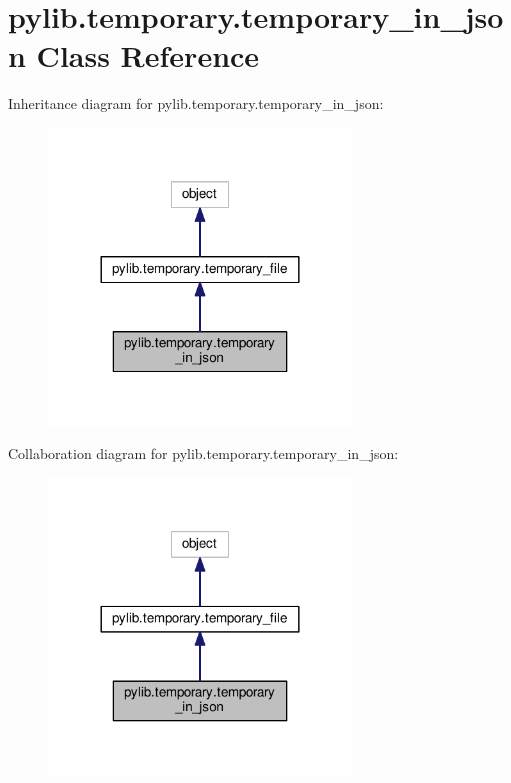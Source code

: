 \hypertarget{classpylib_1_1temporary_1_1temporary__in__json}{}\section{pylib.\+temporary.\+temporary\+\_\+in\+\_\+json Class Reference}
\label{classpylib_1_1temporary_1_1temporary__in__json}


Inheritance diagram for pylib.\+temporary.\+temporary\+\_\+in\+\_\+json\+:
\nopagebreak
\begin{figure}[H]
\begin{center}
\leavevmode
\includegraphics[width=228pt]{classpylib_1_1temporary_1_1temporary__in__json__inherit__graph}
\end{center}
\end{figure}


Collaboration diagram for pylib.\+temporary.\+temporary\+\_\+in\+\_\+json\+:
\nopagebreak
\begin{figure}[H]
\begin{center}
\leavevmode
\includegraphics[width=228pt]{classpylib_1_1temporary_1_1temporary__in__json__coll__graph}
\end{center}
\end{figure}
